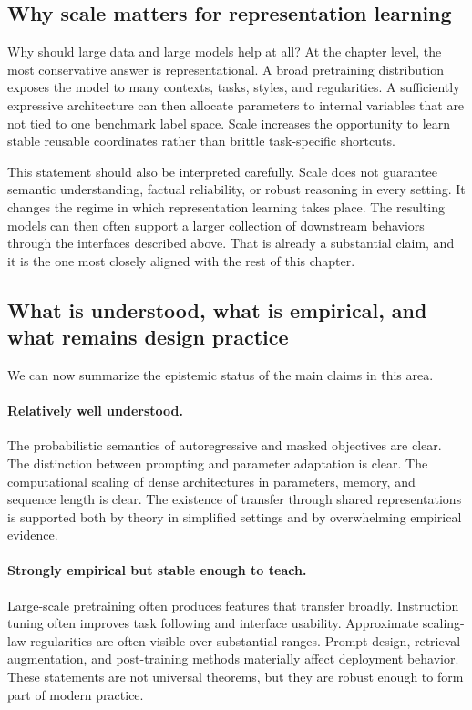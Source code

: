 \subsection*{Why scale matters for representation learning}

Why should large data and large models help at all?
At the chapter level, the most conservative answer is representational.
A broad pretraining distribution exposes the model to many contexts, tasks, styles, and regularities.
A sufficiently expressive architecture can then allocate parameters to internal variables that are not tied to one benchmark label space.
Scale increases the opportunity to learn stable reusable coordinates rather than brittle task-specific shortcuts.

This statement should also be interpreted carefully.
Scale does not guarantee semantic understanding, factual reliability, or robust reasoning in every setting.
It changes the regime in which representation learning takes place.
The resulting models can then often support a larger collection of downstream behaviors through the interfaces described above.
That is already a substantial claim, and it is the one most closely aligned with the rest of this chapter.

\subsection*{What is understood, what is empirical, and what remains design practice}

We can now summarize the epistemic status of the main claims in this area.

\paragraph{Relatively well understood.}
The probabilistic semantics of autoregressive and masked objectives are clear.
The distinction between prompting and parameter adaptation is clear.
The computational scaling of dense architectures in parameters, memory, and sequence length is clear.
The existence of transfer through shared representations is supported both by theory in simplified settings and by overwhelming empirical evidence.

\paragraph{Strongly empirical but stable enough to teach.}
Large-scale pretraining often produces features that transfer broadly.
Instruction tuning often improves task following and interface usability.
 Approximate scaling-law regularities are often visible over substantial ranges.
Prompt design, retrieval augmentation, and post-training methods materially affect deployment behavior.
These statements are not universal theorems, but they are robust enough to form part of modern practice.

